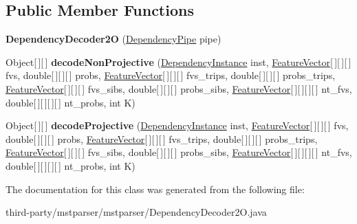 \subsection*{Public Member Functions}
\begin{DoxyCompactItemize}
\item 
\hypertarget{classmstparser_1_1DependencyDecoder2O_a5a7f250ac724023f0485affab2ae85da}{
{\bfseries DependencyDecoder2O} (\hyperlink{classmstparser_1_1DependencyPipe}{DependencyPipe} pipe)}
\label{classmstparser_1_1DependencyDecoder2O_a5a7f250ac724023f0485affab2ae85da}

\item 
\hypertarget{classmstparser_1_1DependencyDecoder2O_a4d277985a59605d040323ff7ef5b5099}{
Object\mbox{[}$\,$\mbox{]}\mbox{[}$\,$\mbox{]} {\bfseries decodeNonProjective} (\hyperlink{classmstparser_1_1DependencyInstance}{DependencyInstance} inst, \hyperlink{classmstparser_1_1FeatureVector}{FeatureVector}\mbox{[}$\,$\mbox{]}\mbox{[}$\,$\mbox{]}\mbox{[}$\,$\mbox{]} fvs, double\mbox{[}$\,$\mbox{]}\mbox{[}$\,$\mbox{]}\mbox{[}$\,$\mbox{]} probs, \hyperlink{classmstparser_1_1FeatureVector}{FeatureVector}\mbox{[}$\,$\mbox{]}\mbox{[}$\,$\mbox{]}\mbox{[}$\,$\mbox{]} fvs\_\-trips, double\mbox{[}$\,$\mbox{]}\mbox{[}$\,$\mbox{]}\mbox{[}$\,$\mbox{]} probs\_\-trips, \hyperlink{classmstparser_1_1FeatureVector}{FeatureVector}\mbox{[}$\,$\mbox{]}\mbox{[}$\,$\mbox{]}\mbox{[}$\,$\mbox{]} fvs\_\-sibs, double\mbox{[}$\,$\mbox{]}\mbox{[}$\,$\mbox{]}\mbox{[}$\,$\mbox{]} probs\_\-sibs, \hyperlink{classmstparser_1_1FeatureVector}{FeatureVector}\mbox{[}$\,$\mbox{]}\mbox{[}$\,$\mbox{]}\mbox{[}$\,$\mbox{]}\mbox{[}$\,$\mbox{]} nt\_\-fvs, double\mbox{[}$\,$\mbox{]}\mbox{[}$\,$\mbox{]}\mbox{[}$\,$\mbox{]}\mbox{[}$\,$\mbox{]} nt\_\-probs, int K)}
\label{classmstparser_1_1DependencyDecoder2O_a4d277985a59605d040323ff7ef5b5099}

\item 
\hypertarget{classmstparser_1_1DependencyDecoder2O_a2d2f846a113931904d142c65a3fd632b}{
Object\mbox{[}$\,$\mbox{]}\mbox{[}$\,$\mbox{]} {\bfseries decodeProjective} (\hyperlink{classmstparser_1_1DependencyInstance}{DependencyInstance} inst, \hyperlink{classmstparser_1_1FeatureVector}{FeatureVector}\mbox{[}$\,$\mbox{]}\mbox{[}$\,$\mbox{]}\mbox{[}$\,$\mbox{]} fvs, double\mbox{[}$\,$\mbox{]}\mbox{[}$\,$\mbox{]}\mbox{[}$\,$\mbox{]} probs, \hyperlink{classmstparser_1_1FeatureVector}{FeatureVector}\mbox{[}$\,$\mbox{]}\mbox{[}$\,$\mbox{]}\mbox{[}$\,$\mbox{]} fvs\_\-trips, double\mbox{[}$\,$\mbox{]}\mbox{[}$\,$\mbox{]}\mbox{[}$\,$\mbox{]} probs\_\-trips, \hyperlink{classmstparser_1_1FeatureVector}{FeatureVector}\mbox{[}$\,$\mbox{]}\mbox{[}$\,$\mbox{]}\mbox{[}$\,$\mbox{]} fvs\_\-sibs, double\mbox{[}$\,$\mbox{]}\mbox{[}$\,$\mbox{]}\mbox{[}$\,$\mbox{]} probs\_\-sibs, \hyperlink{classmstparser_1_1FeatureVector}{FeatureVector}\mbox{[}$\,$\mbox{]}\mbox{[}$\,$\mbox{]}\mbox{[}$\,$\mbox{]}\mbox{[}$\,$\mbox{]} nt\_\-fvs, double\mbox{[}$\,$\mbox{]}\mbox{[}$\,$\mbox{]}\mbox{[}$\,$\mbox{]}\mbox{[}$\,$\mbox{]} nt\_\-probs, int K)}
\label{classmstparser_1_1DependencyDecoder2O_a2d2f846a113931904d142c65a3fd632b}

\end{DoxyCompactItemize}


The documentation for this class was generated from the following file:\begin{DoxyCompactItemize}
\item 
third-\/party/mstparser/mstparser/DependencyDecoder2O.java\end{DoxyCompactItemize}
